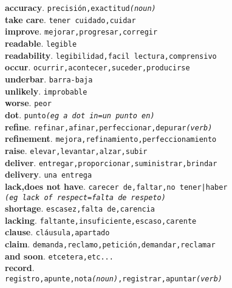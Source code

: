 \documentclass[twocolumn]{article}
\begin{document}
	\textsf{\textbf{accuracy}}. \texttt{precisi\'on,exactitud{\scriptsize \textsl{(noun)}}}\\
	\textsf{\textbf{take care}}. \texttt{tener cuidado,cuidar}\\
	\textsf{\textbf{improve}}. \texttt{mejorar,progresar,corregir}\\
	\textsf{\textbf{readable}}. \texttt{legible}\\
	\textsf{\textbf{readability}}. \texttt{legibilidad,facil lectura,comprensivo}\\
	\textsf{\textbf{occur}}. \texttt{ocurrir,acontecer,suceder,producirse}\\
	\textsf{\textbf{underbar}}. \texttt{barra-baja}\\
	\textsf{\textbf{unlikely}}. \texttt{improbable}\\
	\textsf{\textbf{worse}}. \texttt{peor}\\
	\textsf{\textbf{dot}}. \texttt{punto{\scriptsize \textsl{(eg a dot in=un punto en)}}}\\
	\textsf{\textbf{refine}}. \texttt{refinar,afinar,perfeccionar,depurar{\scriptsize \textsl{(verb)}}}\\
	\textsf{\textbf{refinement}}. \texttt{mejora,refinamiento,perfeccionamiento}\\
	\textsf{\textbf{raise}}. \texttt{elevar,levantar,alzar,subir}\\
	\textsf{\textbf{deliver}}. \texttt{entregar,proporcionar,suministrar,brindar}\\
	\textsf{\textbf{delivery}}. \texttt{una entrega}\\
	\textsf{\textbf{lack,does not have}}. \texttt{carecer de,faltar,no tener|haber\\{\scriptsize \textsl{(eg lack of respect=falta de respeto)}}}\\
	\textsf{\textbf{shortage}}. \texttt{escasez,falta de,carencia}\\
	\textsf{\textbf{lacking}}. \texttt{faltante,insuficiente,escaso,carente}\\
	\textsf{\textbf{clause}}. \texttt{cl\'ausula,apartado}\\
	\textsf{\textbf{claim}}. \texttt{demanda,reclamo,petici\'on,demandar,reclamar}\\
	\textsf{\textbf{and soon}}. \texttt{etcetera,etc...}\\
	\textsf{\textbf{record}}.\\
        \texttt{registro,apunte,nota{\scriptsize \textsl{(noun)}},registrar,apuntar{\scriptsize \textsl{(verb)}}}\\
\end{document}
